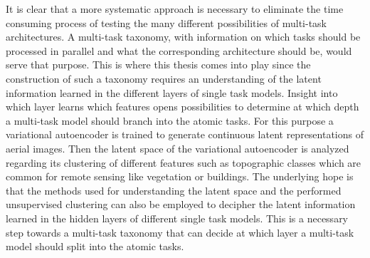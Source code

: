 It is clear that a more systematic approach is necessary to eliminate the time consuming process of testing 
the many different possibilities of multi-task architectures. A multi-task taxonomy, with information on which tasks
should be processed in parallel and what the corresponding architecture should be, would serve that purpose.
This is where this thesis comes into play since the construction of such a taxonomy requires an understanding
of the latent information learned in the different layers of single task models. Insight into which layer
learns which features opens possibilities to determine at which depth a multi-task model should branch
into the atomic tasks. 
For this purpose a variational autoencoder is trained to generate continuous latent representations of aerial images.
Then the latent space of the variational autoencoder is analyzed regarding its clustering of different
features such as topographic classes which are common for remote sensing like vegetation or buildings.
The underlying hope is that 
the methods used for understanding the latent space and the performed unsupervised clustering can also be
employed to decipher the latent information learned in the hidden layers of different single task models. 
This is a necessary step towards a multi-task taxonomy that can decide at which layer a multi-task model
should split into the atomic tasks.
